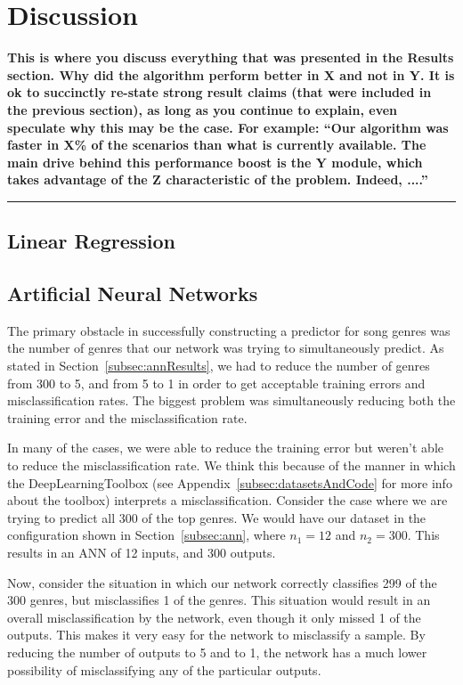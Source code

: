 \documentclass[12pt]{article}
\newcommand{\smallHorizontalLine}{
    \begin{center}
        \hrule width 0.5\textwidth
    \end{center}}
\begin{document}
\section{Discussion}
\label{sec:discussion}
\textbf{This is where you discuss everything that was presented in the Results section.
    Why did the algorithm perform better in X and not in Y. It is ok to succinctly re-state strong
    result claims (that were included in the previous section), as long as you continue to explain,
    even speculate why this may be the case. For example: \textquotedblleft Our algorithm was faster in X\% of the
    scenarios than what is currently available. The main drive behind this performance boost is the Y module, which takes advantage of the Z characteristic of the problem. Indeed, ....\textquotedblright}
\smallHorizontalLine

\subsection{Linear Regression}
\label{subsec:linearRegressionDisc}

\subsection{Artificial Neural Networks}
\label{subsec:annDisc}
The primary obstacle in successfully constructing a predictor for song genres was the number of genres that our network was trying to simultaneously predict. As stated in Section~\ref{subsec:annResults}, we had to reduce the number of genres from 300 to 5, and from 5 to 1 in order to get acceptable training errors and misclassification rates. The biggest problem was simultaneously reducing both the training error and the misclassification rate. 

In many of the cases, we were able to reduce the training error but weren't able to reduce the misclassification rate. We think this because of the manner in which the DeepLearningToolbox (see Appendix~\ref{subsec:datasetsAndCode} for more info about the toolbox) interprets a misclassification. Consider the case where we are trying to predict all 300 of the top genres. We would have our dataset in the configuration shown in Section~\ref{subsec:ann}, where $n_1 = 12$ and $n_2 = 300$. This results in an ANN of 12 inputs, and 300 outputs. 

Now, consider the situation in which our network correctly classifies 299 of the 300 genres, but misclassifies 1 of the genres. This situation would result in an overall misclassification by the network, even though it only missed 1 of the outputs. This makes it very easy for the network to misclassify a sample. By reducing the number of outputs to 5 and to 1, the network has a much lower possibility of misclassifying any of the particular outputs. 
\end{document}
